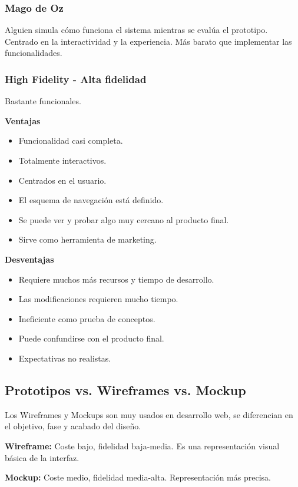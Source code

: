 \documentclass[12pt, twoside, openright]{report} %
\begin{document}
\subsubsection{Mago de Oz}

Alguien simula cómo funciona el sistema mientras se evalúa el prototipo. Centrado en la interactividad y la experiencia. Más barato que implementar las funcionalidades.

\subsubsection{High Fidelity - Alta fidelidad}
Bastante funcionales.

\textbf{Ventajas}
\begin{itemize}
	\item Funcionalidad casi completa.
	\item Totalmente interactivos.
	\item Centrados en el usuario.
	\item El esquema de navegación está definido.
	\item Se puede ver y probar algo muy cercano al producto final.
	\item Sirve como herramienta de marketing.
\end{itemize}

\textbf{Desventajas}
\begin{itemize}
	\item Requiere muchos más recursos y tiempo de desarrollo.
	\item Las modificaciones requieren mucho tiempo.
	\item Ineficiente como prueba de conceptos.
	\item Puede confundirse con el producto final.
	\item Expectativas no realistas.
\end{itemize}

\subsection{Prototipos vs. Wireframes vs. Mockup}
Los Wireframes y Mockups son muy usados en desarrollo web, se diferencian en el objetivo, fase y acabado del diseño.

\textbf{Wireframe:} Coste bajo, fidelidad baja-media. Es una representación visual básica de la interfaz.

\textbf{Mockup:} Coste medio, fidelidad media-alta. Representación más precisa.
\end{document}
